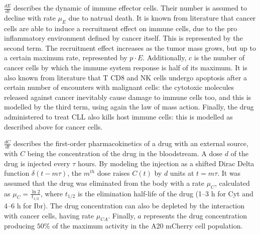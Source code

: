 $\frac{dE}{dt}$ describes the dynamic of immune effector cells. Their number is assumed to decline with rate $\mu_{E}$ due to natrual death. It is known from literature that cancer cells are able to induce a recruitment effect on immune cells, due to the pro inflammatory environment defined by cancer itself. This is represented by the second term. The recruitment effect increases as the tumor mass grows, but up to a certain maximum rate, represented by $p \cdot E$. Additionally, $c$ is the number of cancer cells by which the immune system response is half of its maximum. It is also known from literature that T CD8 and NK cells undergo apoptosis after a certain number of encounters with malignant cells: the cytotoxic molecules released against cancer inevitably cause damage to immune cells too, and this is modelled by the third term, using again the law of mass action. Finally, the drug administered to treat CLL also kills host immune cells: this is modelled as described above for cancer cells. \par
\vspace{0.4cm}
$\frac{dC}{dt}$ describes the first-order pharmacokinetics of a drug with an external source, with $C$ being the concentration of the drug in the bloodstream. A dose $d$ of the drug is injected every $\tau$ hours. By modeling the injection as a shifted Dirac Delta function $\delta (t - m\tau)$, the $m^{th}$ dose raises $C(t)$ by $d$ units at $t=m\tau$. It was assumed that the drug was eliminated from the body with a rate $\mu_C$, calculated as $\mu_C = \frac{\ln 2}{t_{1/2}}$, where $t_{1/2}$ is the elimination half-life of the drug (1–3 h for Cyt and 4–6 h for Ibr). The drug concentration can also be depleted by the interaction with cancer cells, having rate $\mu_{CA}$. Finally, $a$ represents the drug concentration producing $50\%$ of the maximum activity in the A20 mCherry cell population. 
